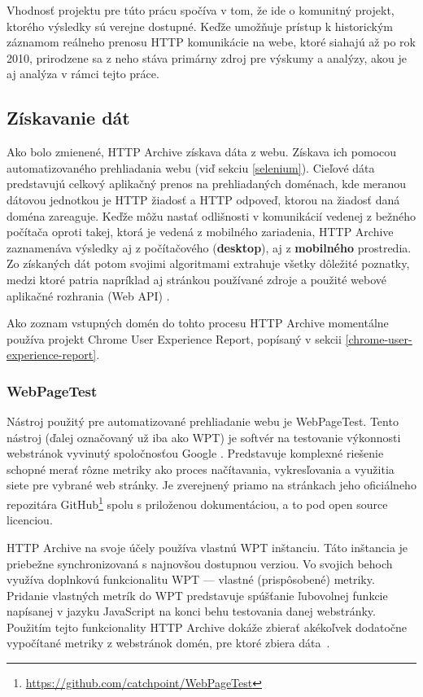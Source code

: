 Vhodnosť projektu pre túto prácu spočíva v tom, že ide o komunitný projekt, ktorého výsledky sú verejne dostupné. 
Keďže umožňuje prístup k historickým záznamom reálneho prenosu HTTP komunikácie na webe, ktoré siahajú až po rok 2010, prirodzene sa z neho stáva primárny zdroj pre výskumy a analýzy, akou je aj analýza v rámci tejto práce.


\subsection{Získavanie dát}
\label{fetching-data}

Ako bolo zmienené, HTTP Archive získava dáta z webu. 
Získava ich pomocou automatizovaného prehliadania webu (viď sekciu \ref{selenium}).
Cieľové dáta predstavujú celkový aplikačný prenos na prehliadaných doménach, kde meranou dátovou jednotkou je HTTP žiadosť a HTTP odpoveď, ktorou na žiadosť daná doména zareaguje.
Keďže môžu nastať odlišnosti v komunikácií vedenej z bežného počítača oproti takej, ktorá je vedená z mobilného zariadenia, HTTP Archive zaznamenáva výsledky aj z počítačového (\textbf{desktop}), aj z \textbf{mobilného} prostredia.
Zo získaných dát potom svojimi algoritmami extrahuje všetky dôležité poznatky, medzi ktoré patria napríklad aj stránkou používané zdroje a použité webové aplikačné rozhrania (Web API) \cite{httparchive-homepage}.

Ako zoznam vstupných domén do tohto procesu HTTP Archive momentálne používa projekt Chrome User Experience Report, popísaný v sekcii \ref{chrome-user-experience-report}.

\subsubsection{WebPageTest}

Nástroj použitý pre automatizované prehliadanie webu je WebPageTest. Tento nástroj (ďalej označovaný už iba ako WPT) je softvér na testovanie výkonnosti webstránok vyvinutý spoločnosťou Google \cite{webpagetest}. 
Predstavuje komplexné riešenie schopné merať rôzne metriky ako proces načítavania, vykresľovania a využitia siete pre vybrané web stránky. 
Je zverejnený priamo na stránkach jeho oficiálneho repozitára GitHub\footnote{\href{https://github.com/catchpoint/WebPageTest}{https://github.com/catchpoint/WebPageTest}} spolu s priloženou dokumentáciou, a to pod open source licenciou.

HTTP Archive na svoje účely používa vlastnú WPT inštanciu. 
Táto inštancia je priebežne synchronizovaná s najnovšou dostupnou verziou.
Vo svojich behoch využíva doplnkovú funkcionalitu WPT --- vlastné (prispôsobené) metriky.
Pridanie vlastných metrík do WPT predstavuje spúšťanie ľubovolnej funkcie napísanej v jazyku JavaScript na konci behu testovania danej webstránky. 
Použitím tejto funkcionality HTTP Archive dokáže zbierať akékoľvek dodatočne vypočítané metriky z webstránok domén, pre ktoré zbiera \mbox{dáta \cite{webpagetest}}.

